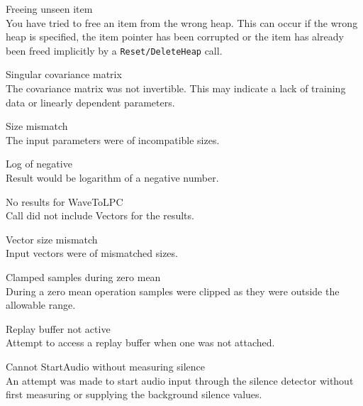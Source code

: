 \begin{itemize}
\begin{itemize}
    Freeing unseen item\\
        You have tried to free an item from the wrong heap.  This can occur
        if the wrong heap is specified, the item pointer has been corrupted 
        or the item has already been freed implicitly by a 
        \texttt{Reset/DeleteHeap} call.  

\end{itemize}
 
 
\begin{itemize}
    Singular covariance matrix\\
        The covariance matrix was not invertible.  This may indicate a lack
        of training data or linearly dependent parameters.

    Size mismatch\\
        The input parameters were of incompatible sizes.

    Log of negative\\
        Result would be logarithm of a negative number.

\end{itemize}


\begin{itemize}
    No results for WaveToLPC\\
        Call did not include Vectors for the results.

    Vector size mismatch\\
        Input vectors were of mismatched sizes.

    Clamped samples during zero mean\\
        During a zero mean operation samples were clipped as they were outside
        the allowable range.

\end{itemize}


\begin{itemize}
    Replay buffer not active\\
        Attempt to access a replay buffer when one was not attached.

    Cannot StartAudio without measuring silence\\
        An attempt was made to start audio input through the silence detector 
        without first measuring or supplying the background silence values.


\end{itemize}
\end{itemize}
